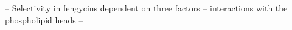 -- Selectivity in fengycins dependent on three factors
-- interactions with the phospholipid heads
-- 